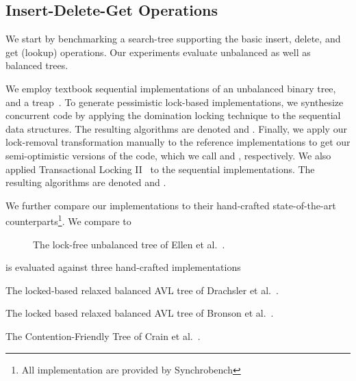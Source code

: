 \subsection{Insert-Delete-Get Operations}
\label{sec:readwrite}

We start by benchmarking a search-tree supporting the basic insert,
delete, and get (lookup) operations. Our experiments evaluate unbalanced as well
as balanced trees.

We employ textbook sequential implementations of an unbalanced binary
tree, and a treap~\cite{AragonS1989}. To
generate pessimistic lock-based implementations, we synthesize
concurrent code by applying the domination locking technique to the sequential
data structures. The resulting algorithms are denoted \domTree and \domTreap.
Finally, we apply our lock-removal transformation manually to the reference
implementations to get our semi-optimistic versions of the code, which we call
\autoTree and \autoTreap, respectively.
We also applied Transactional Locking II~\cite{DiceSS2006} to the sequential implementations. The resulting algorithms are denoted \stmTree and \stmTreap.

We further compare our implementations to their hand-crafted state-of-the-art counterparts\footnote{All implementation are provided by Synchrobench}. We compare \autoTree to
\begin{description}
\item [\lockfreeTree] The lock-free unbalanced tree of Ellen et al.~\cite{EllenFRB2010}.
\end{description}
\autoTreap is evaluated against three hand-crafted implementations
\begin{description}
\setlength{\itemsep}{0pt}
\setlength{\parskip}{0pt}
\item[\danaAVL] The locked-based relaxed balanced AVL tree of
				Drachsler et al.~\cite{DrachslerVY2014}.%
\item[\bronson] The locked based relaxed balanced AVL tree
				of Bronson et al.~\cite{BronsonCCO2010}.%
\item[\friendly] The Contention-Friendly Tree of Crain et al.~\cite{CrainGR2013}.
\end{description}

